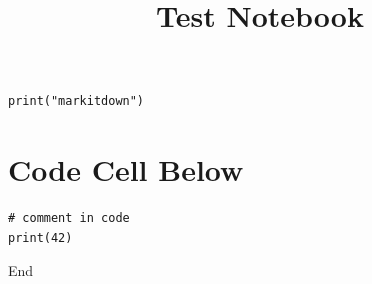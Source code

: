 \documentclass[11pt,a4paper]{article}
\title{Test Notebook}
\begin{document}
\maketitle

\begin{verbatim}
print("markitdown")
\end{verbatim}

\section{Code Cell Below}

\begin{verbatim}
# comment in code
print(42)
\end{verbatim}

End
\end{document}
